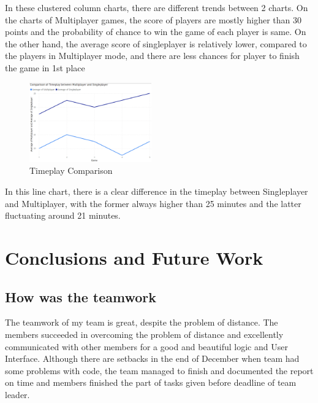 \documentclass[conference]{IEEEtran}
\begin{document}
    \newpage
    In these clustered column charts, there are different trends between 2 charts. On the charts of Multiplayer games, the score of players are mostly higher than 30 points and the probability of chance to win the game of each player is same. On the other hand, the average score of singleplayer is relatively lower, compared to the players in Multiplayer mode, and there are less chances for player to finish the game in 1st place 


    \begin{figure}[h!]
        \centering
        \includegraphics[width=0.47\textwidth]{img/Screenshot 2025-01-18 153925.png} %
        \caption{Timeplay Comparison
        }
        \label{fig:case}
    \end{figure}

    In this line chart, there is a clear difference in the timeplay between Singleplayer and Multiplayer, with the former always higher than 25 minutes and the latter fluctuating around 21 minutes.
    

    

\section{Conclusions and Future Work}

\subsection{How was the teamwork}
The teamwork of my team is great, despite the problem of distance. The members succeeded in overcoming the problem of distance and excellently communicated with other members for a good and beautiful logic and User Interface. Although there are setbacks in the end of December when team had some problems with code, the team managed to finish and documented the report on time and members finished the part of tasks given before deadline of team leader. 
\end{document}
